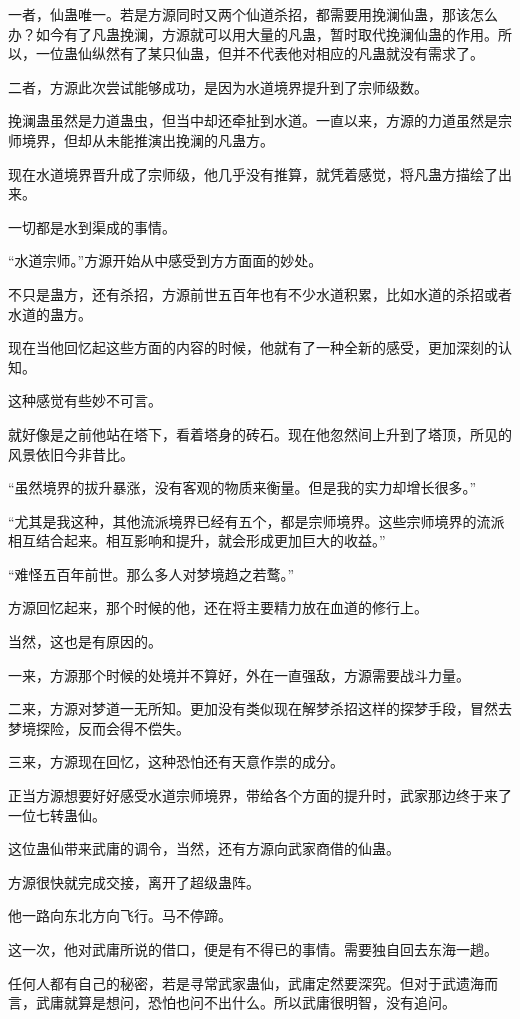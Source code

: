 \begin{this_body}
一者，仙蛊唯一。若是方源同时又两个仙道杀招，都需要用挽澜仙蛊，那该怎么办？如今有了凡蛊挽澜，方源就可以用大量的凡蛊，暂时取代挽澜仙蛊的作用。所以，一位蛊仙纵然有了某只仙蛊，但并不代表他对相应的凡蛊就没有需求了。

二者，方源此次尝试能够成功，是因为水道境界提升到了宗师级数。

挽澜蛊虽然是力道蛊虫，但当中却还牵扯到水道。一直以来，方源的力道虽然是宗师境界，但却从未能推演出挽澜的凡蛊方。

现在水道境界晋升成了宗师级，他几乎没有推算，就凭着感觉，将凡蛊方描绘了出来。

一切都是水到渠成的事情。

“水道宗师。”方源开始从中感受到方方面面的妙处。

不只是蛊方，还有杀招，方源前世五百年也有不少水道积累，比如水道的杀招或者水道的蛊方。

现在当他回忆起这些方面的内容的时候，他就有了一种全新的感受，更加深刻的认知。

这种感觉有些妙不可言。

就好像是之前他站在塔下，看着塔身的砖石。现在他忽然间上升到了塔顶，所见的风景依旧今非昔比。

“虽然境界的拔升暴涨，没有客观的物质来衡量。但是我的实力却增长很多。”

“尤其是我这种，其他流派境界已经有五个，都是宗师境界。这些宗师境界的流派相互结合起来。相互影响和提升，就会形成更加巨大的收益。”

“难怪五百年前世。那么多人对梦境趋之若鹜。”

方源回忆起来，那个时候的他，还在将主要精力放在血道的修行上。

当然，这也是有原因的。

一来，方源那个时候的处境并不算好，外在一直强敌，方源需要战斗力量。

二来，方源对梦道一无所知。更加没有类似现在解梦杀招这样的探梦手段，冒然去梦境探险，反而会得不偿失。

三来，方源现在回忆，这种恐怕还有天意作祟的成分。

正当方源想要好好感受水道宗师境界，带给各个方面的提升时，武家那边终于来了一位七转蛊仙。

这位蛊仙带来武庸的调令，当然，还有方源向武家商借的仙蛊。

方源很快就完成交接，离开了超级蛊阵。

他一路向东北方向飞行。马不停蹄。

这一次，他对武庸所说的借口，便是有不得已的事情。需要独自回去东海一趟。

任何人都有自己的秘密，若是寻常武家蛊仙，武庸定然要深究。但对于武遗海而言，武庸就算是想问，恐怕也问不出什么。所以武庸很明智，没有追问。


\end{this_body}
